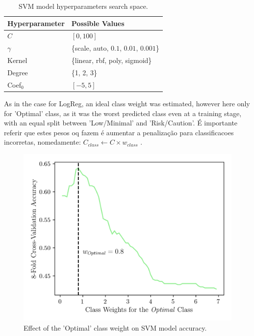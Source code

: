 \documentclass[conference]{IEEEtran}
\begin{document}
\begin{table}[H]
\centering
\caption{SVM model hyperparameters search space.}
\label{parametrosSVM}
\begin{tabular}{ll}
\toprule
\textbf{Hyperparameter} & \textbf{Possible Values} \\
\midrule
$C$ & $[0, 100]$ \\ 
$\gamma$ & \{scale, auto, $0.1$, $0.01$, $0.001$\} \\ 
Kernel & \{linear, rbf, poly, sigmoid\} \\ 
Degree & \{1, 2, 3\} \\ 
Coef$_0$ & $[-5, 5]$ \\
\bottomrule
\end{tabular}
\end{table}

As in the case for LogReg, an ideal class weight was estimated, however here only for 'Optimal' class, as it was the worst predicted class even at a training stage, with an equal split between 'Low/Minimal' and 'Risk/Caution'. É importante referir que estes pesos oq fazem é aumentar a penalização para classificacoes incorretas, nomedamente: $C_{class} \leftarrow C \times w_{class}$ \cite{svm24}.

\begin{figure}[H]
    \centering
    \includegraphics[width=1\linewidth]{assets/SVM_OptimalWeight.png}
    \caption{Effect of the 'Optimal' class weight on SVM model accuracy.}
    \label{svm_weight}
\end{figure}
\end{document}
